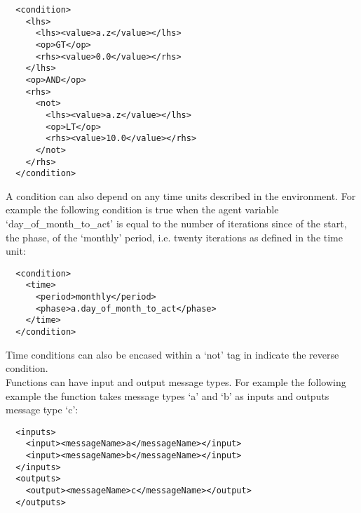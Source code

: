 \begin{verbatim}
  <condition>
    <lhs>
      <lhs><value>a.z</value></lhs>
      <op>GT</op>
      <rhs><value>0.0</value></rhs>
    </lhs>
    <op>AND</op>
    <rhs>
      <not>
        <lhs><value>a.z</value></lhs>
        <op>LT</op>
        <rhs><value>10.0</value></rhs>
      </not>
    </rhs>
  </condition>
\end{verbatim}

A condition can also depend on any time units described in the environment. For
example the following condition is true when the agent variable
`day\_of\_month\_to\_act' is equal to the number of iterations since of the
start, the phase, of the `monthly' period, i.e. twenty iterations as defined in
the time unit:

\begin{verbatim}
  <condition>
    <time>
      <period>monthly</period>
      <phase>a.day_of_month_to_act</phase>
    </time>
  </condition>
\end{verbatim}

Time conditions can also be encased within a `not' tag in indicate the reverse
condition. \\

% 
% 

Functions can have input and output message types. For example the following
example the function takes message types `a' and `b' as inputs and outputs
message type `c':

\begin{verbatim}
  <inputs>
    <input><messageName>a</messageName></input>
    <input><messageName>b</messageName></input>
  </inputs>
  <outputs>
    <output><messageName>c</messageName></output>
  </outputs>
\end{verbatim}

